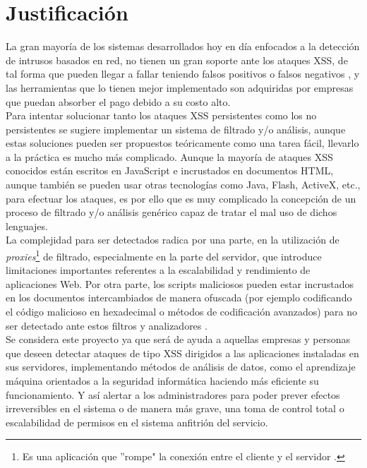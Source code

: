 \section{Justificación}

La gran mayoría de los sistemas desarrollados hoy en día enfocados a la detección de intrusos basados en red, no tienen un gran soporte ante los ataques XSS, de tal forma que pueden llegar a fallar teniendo falsos positivos o falsos negativos \cite{trece}\cite{catorce}, y las herramientas que lo tienen mejor implementado son adquiridas por empresas que puedan absorber el pago debido a su costo alto.\\

Para intentar solucionar tanto los ataques XSS persistentes como los no persistentes se sugiere implementar un sistema de filtrado y/o análisis, aunque estas soluciones pueden ser propuestos teóricamente como una tarea fácil, llevarlo a la práctica es mucho más complicado. Aunque la mayoría de ataques XSS conocidos están escritos en JavaScript e incrustados en documentos HTML, aunque también se pueden usar otras tecnologías como Java, Flash, ActiveX, etc., para efectuar los ataques, es por ello que es muy complicado la concepción de un proceso de filtrado y/o análisis genérico capaz de tratar el mal uso de dichos lenguajes.\\

La complejidad para ser detectados radica por una parte, en la utilización de \textit{proxies}\footnote{Es una aplicación que ''rompe" la conexión entre el cliente y el servidor \cite{proxy}.}  de filtrado, especialmente en la parte del servidor, que introduce limitaciones importantes referentes a la escalabilidad y rendimiento de aplicaciones Web. Por otra parte, los scripts maliciosos pueden estar incrustados en los documentos intercambiados de manera ofuscada (por ejemplo codificando el código malicioso en hexadecimal o métodos de codificación avanzados) para no ser detectado ante estos filtros y analizadores \cite{quince}.\\

Se considera este proyecto ya que será de ayuda a aquellas empresas y personas que deseen detectar ataques de tipo XSS dirigidos a las aplicaciones instaladas en sus servidores, implementando métodos de análisis de datos, como el aprendizaje máquina orientados a la seguridad informática haciendo más eficiente su funcionamiento. Y así alertar a los administradores para poder prever efectos irreversibles en el sistema o de manera más grave, una toma de control total o escalabilidad de permisos en el sistema anfitrión del servicio.\\